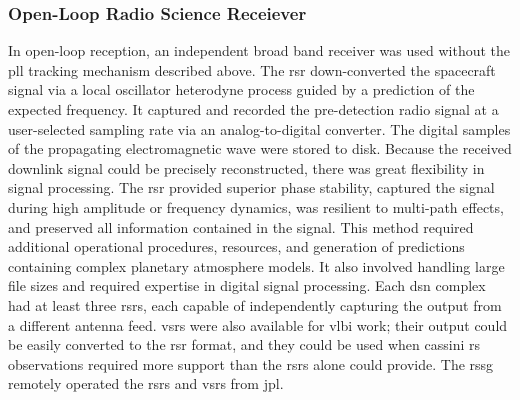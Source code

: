 \documentclass[crop=false,class=article,oneside]{standalone}
\begin{document}
        \subsubsection{%
            \footnotesize{Open-Loop Radio Science Receiever}
        }
            \label{subsubsec:usr_open_loop_rad_sci_rec}
            In \gls{open-loop} reception, an independent broad
            band receiver was used without the \gls{pll}
            tracking mechanism described above. The \gls{rsr}
            down-converted the spacecraft signal via a local
            \gls{oscillator} \gls{heterodyne} process guided
            by a prediction of the expected \gls{frequency}.
            It captured and recorded the pre-detection radio
            signal at a user-selected \gls{sampling rate} via
            an \gls{analog-to-digital converter}. The digital
            samples of the propagating electromagnetic wave
            were stored to disk. Because the received
            \gls{downlink} signal could be precisely
            reconstructed, there was great flexibility in
            signal processing. The \gls{rsr} provided superior
            \gls{phase stability}, captured the signal during
            high \gls{amplitude} or \gls{frequency} dynamics,
            was resilient to \glspl{multi-path effect}, and
            preserved all information contained in the signal.
            This method required additional operational
            procedures, resources, and generation of
            predictions containing complex planetary
            atmosphere models. It also involved handling
            large file sizes and required expertise in
            digital signal processing. Each \gls{dsn}
            complex had at least three \glspl{rsr},
            each capable of independently capturing the
            output from a different antenna feed.
            \glspl{vsr} were also available for \gls{vlbi}
            work; their output could be easily converted to
            the \gls{rsr} format, and they could be used when
            \gls{cassini} \gls{rs} observations required more
            support than the \glspl{rsr} alone could provide.
            The \gls{rssg} remotely operated the \glspl{rsr}
            and \gls{vsr}s from \gls{jpl}.
\end{document}
